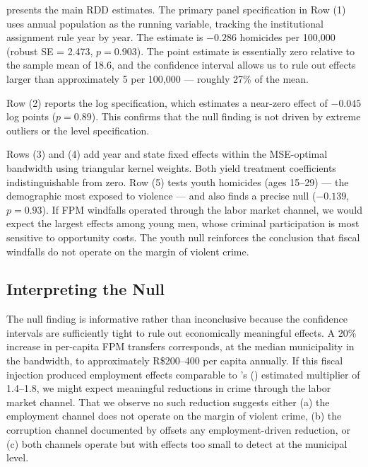 \documentclass[12pt]{article}
\begin{document}
 presents the main RDD estimates. The primary panel specification in Row (1) uses annual population as the running variable, tracking the institutional assignment rule year by year. The estimate is $-0.286$ homicides per 100,000 (robust SE = 2.473, $p = 0.903$). The point estimate is essentially zero relative to the sample mean of 18.6, and the confidence interval allows us to rule out effects larger than approximately 5 per 100,000 --- roughly 27\% of the mean.

Row (2) reports the log specification, which estimates a near-zero effect of $-0.045$ log points ($p = 0.89$). This confirms that the null finding is not driven by extreme outliers or the level specification.

Rows (3) and (4) add year and state fixed effects within the MSE-optimal bandwidth using triangular kernel weights. Both yield treatment coefficients indistinguishable from zero. Row (5) tests youth homicides (ages 15--29) --- the demographic most exposed to violence --- and also finds a precise null ($-0.139$, $p = 0.93$). If FPM windfalls operated through the labor market channel, we would expect the largest effects among young men, whose criminal participation is most sensitive to opportunity costs. The youth null reinforces the conclusion that fiscal windfalls do not operate on the margin of violent crime.



\subsection{Interpreting the Null}

The null finding is informative rather than inconclusive because the confidence intervals are sufficiently tight to rule out economically meaningful effects. A 20\% increase in per-capita FPM transfers corresponds, at the median municipality in the bandwidth, to approximately R\$200--400 per capita annually. If this fiscal injection produced employment effects comparable to \citeauthor{corbi2019fiscal}'s (\citeyear{corbi2019fiscal}) estimated multiplier of 1.4--1.8, we might expect meaningful reductions in crime through the labor market channel. That we observe no such reduction suggests either (a) the employment channel does not operate on the margin of violent crime, (b) the corruption channel documented by \citet{brollo2013political} offsets any employment-driven reduction, or (c) both channels operate but with effects too small to detect at the municipal level.
\end{document}
